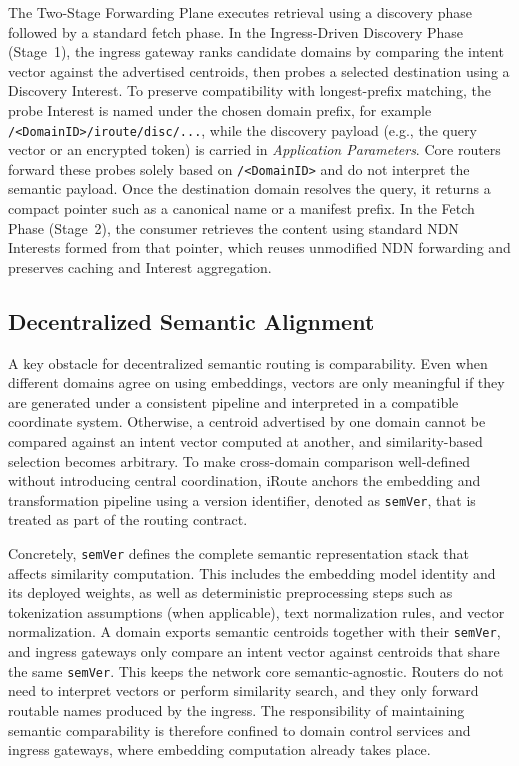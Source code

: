 \documentclass[journal]{IEEEtran}
\newcommand{\sysname}{iRoute}
\begin{document}
The Two-Stage Forwarding Plane executes retrieval using a discovery phase followed by a standard fetch phase. In the Ingress-Driven Discovery Phase (Stage~1), the ingress gateway ranks candidate domains by comparing the intent vector against the advertised centroids, then probes a selected destination using a Discovery Interest. To preserve compatibility with longest-prefix matching, the probe Interest is named under the chosen domain prefix, for example \texttt{/<DomainID>/iroute/disc/...}, while the discovery payload (e.g., the query vector or an encrypted token) is carried in \textit{Application Parameters}. Core routers forward these probes solely based on \texttt{/<DomainID>} and do not interpret the semantic payload. Once the destination domain resolves the query, it returns a compact pointer such as a canonical name or a manifest prefix. In the Fetch Phase (Stage~2), the consumer retrieves the content using standard NDN Interests formed from that pointer, which reuses unmodified NDN forwarding and preserves caching and Interest aggregation.

\subsection{Decentralized Semantic Alignment}
\label{sec:design_space}

A key obstacle for decentralized semantic routing is comparability. Even when different domains agree on using embeddings, vectors are only meaningful if they are generated under a consistent pipeline and interpreted in a compatible coordinate system. Otherwise, a centroid advertised by one domain cannot be compared against an intent vector computed at another, and similarity-based selection becomes arbitrary. To make cross-domain comparison well-defined without introducing central coordination, \sysname{} anchors the embedding and transformation pipeline using a version identifier, denoted as \texttt{semVer}, that is treated as part of the routing contract.

Concretely, \texttt{semVer} defines the complete semantic representation stack that affects similarity computation. This includes the embedding model identity and its deployed weights, as well as deterministic preprocessing steps such as tokenization assumptions (when applicable), text normalization rules, and vector normalization. A domain exports semantic centroids together with their \texttt{semVer}, and ingress gateways only compare an intent vector against centroids that share the same \texttt{semVer}. This keeps the network core semantic-agnostic. Routers do not need to interpret vectors or perform similarity search, and they only forward routable names produced by the ingress. The responsibility of maintaining semantic comparability is therefore confined to domain control services and ingress gateways, where embedding computation already takes place.
\end{document}
